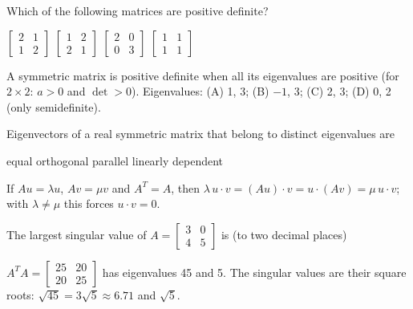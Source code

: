 \begin{question}[id=sym-3, type=msq, marks=2]
Which of the following matrices are positive definite?
\begin{options}
  \correct $\begin{bmatrix} 2 & 1 \\ 1 & 2 \end{bmatrix}$
  \option $\begin{bmatrix} 1 & 2 \\ 2 & 1 \end{bmatrix}$
  \correct $\begin{bmatrix} 2 & 0 \\ 0 & 3 \end{bmatrix}$
  \option $\begin{bmatrix} 1 & 1 \\ 1 & 1 \end{bmatrix}$
\end{options}
\begin{solution}
A symmetric matrix is positive definite when all its eigenvalues are positive (for $2 \times 2$: $a > 0$ and $\det > 0$). Eigenvalues: (A) 1, 3; (B) $-1$, 3; (C) 2, 3; (D) 0, 2 (only semidefinite).
\end{solution}
\end{question}

\begin{question}[id=sym-4]
Eigenvectors of a real symmetric matrix that belong to distinct eigenvalues are
\begin{options}
  \option equal
  \correct orthogonal
  \option parallel
  \option linearly dependent
\end{options}
\begin{solution}
If $Au = \lambda u$, $Av = \mu v$ and $A^T = A$, then $\lambda\, u \cdot v = (Au) \cdot v = u \cdot (Av) = \mu\, u \cdot v$; with $\lambda \ne \mu$ this forces $u \cdot v = 0$.
\end{solution}
\end{question}

\begin{question}[id=sym-5, marks=2]
The largest singular value of $A = \begin{bmatrix} 3 & 0 \\ 4 & 5 \end{bmatrix}$ is (to two decimal places)
\begin{solution}
$A^TA = \begin{bmatrix} 25 & 20 \\ 20 & 25 \end{bmatrix}$ has eigenvalues 45 and 5. The singular values are their square roots: $\sqrt{45} = 3\sqrt{5} \approx 6.71$ and $\sqrt{5}$.
\end{solution}
\end{question}


